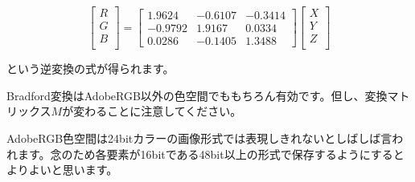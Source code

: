 \documentclass[12pt]{jsarticle}
\begin{document}
\begin{equation}
\begin{bmatrix}
R \\
G \\
B \\
\end{bmatrix}
=
\begin{bmatrix}
1.9624 & -0.6107 & -0.3414 \\
-0.9792 & 1.9167 & 0.0334 \\
0.0286 & -0.1405 & 1.3488
\end{bmatrix}
\begin{bmatrix}
X \\
Y \\
Z \\
\end{bmatrix}
\label{eq:AdobeRGBinv_icc}
\end{equation}

という逆変換の式が得られます。

Bradford変換はAdobeRGB以外の色空間でももちろん有効です。但し、変換マトリックス$M$が変わることに注意してください。

AdobeRGB色空間は24bitカラーの画像形式では表現しきれないとしばしば言われます。念のため各要素が16bitである48bit以上の形式で保存するようにするとよりよいと思います。
\end{document}

